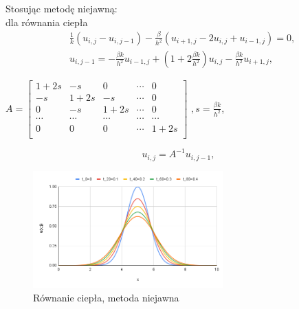 \documentclass[12pt, a4paper]{article}
\begin{document}
\newpage
Stosując metodę niejawną:\\
dla równania ciepła
\begin{equation}
\begin{split}
& \frac{1}{k}(u_{i,j}-u_{i,j-1})-\frac{\beta}{h^{2}}(u_{i+1,j}-2u_{i,j}+u_{i-1,j})=0,\\
& u_{i,j-1}=-\frac{\beta k}{h^{2}}u_{i-1,j}+(1+2\frac{\beta k}{h^{2}})u_{i,j}-\frac{\beta k}{h^{2}}u_{i+1,j},
\end{split}
\end{equation}
\begin{center}
$A=
\begin{bmatrix}
1+2s & -s & 0 & \cdots & 0\\
-s & 1+2s & -s & \cdots & 0\\
0 & -s & 1+2s & \cdots & 0\\
\cdots & \cdots & \cdots & \cdots & \cdots\\
0 & 0 & 0 & \cdots & 1+2s\\
\end{bmatrix}$
$, s=\frac{\beta k}{h^{2}}$,
\end{center}
\begin{equation}
u_{i,j}=A^{-1}u_{i,j-1},
\end{equation}
\begin{figure}[h]
\caption{Równanie ciepła, metoda niejawna}
\centering
\includegraphics[width=0.65\textwidth]{8}
\end{figure}
\newpage
\end{document}
